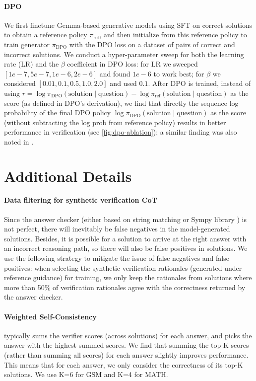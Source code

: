 \paragraph{DPO} We first finetune Gemma-based generative models using SFT on correct solutions to obtain a reference policy $\pi_{\text{ref}}$, and then initialize from this reference policy to train generator $\pi_{\text{DPO}}$ with the DPO loss on a dataset of pairs of correct and incorrect solutions. We conduct a hyper-parameter sweep for both the learning rate (LR) and the $\beta$ coefficient in DPO loss: for LR we sweeped $[1e-7, 5e-7, 1e-6, 2e-6]$ and found $1e-6$ to work best; for $\beta$ we considered $[0.01, 0.1, 0.5, 1.0, 2.0]$ and used $0.1$. After DPO is trained, instead of using $r=\log \pi_{\text{DPO}}(\text{solution}\mid \text{question}) - \log \pi_{\text{ref}}(\text{solution}\mid \text{question})$ as the score (as defined in DPO's derivation), we find that directly the sequence log probability of the final DPO policy $\log\pi_{\text{DPO}}(\text{solution}\mid \text{question})$ as the score (without subtracting the log prob from reference policy) results in better performance in verification (see \autoref{fig:dpo-ablation}); a similar finding was also noted in \citep{hosseini2024v}.

\section{Additional Details}

\paragraph{Data filtering for synthetic verification CoT} Since the answer checker (either based on string matching or Sympy library \citep{sympy}) is not perfect, there will inevitably be false negatives in the model-generated solutions. Besides, it is possible for a solution to arrive at the right answer with an incorrect reasoning path, so there will also be false positives in solutions. We use the following strategy to mitigate the issue of false negatives and false positives: when selecting the synthetic verification rationales (generated under reference guidance) for training, we only keep the rationales from solutions where more than 50\% of verification rationales agree with the correctness returned by the answer checker.

\paragraph{Weighted Self-Consistency} typically sums the verifier scores (across solutions) for each answer, and picks the answer with the highest summed scores. We find that summing the top-K scores (rather than summing all scores) for each answer slightly improves performance. This means that for each answer, we only consider the correctness of its top-K solutions. We use K=6 for GSM and K=4 for MATH.
\label{sec:weighted-sc-details}

